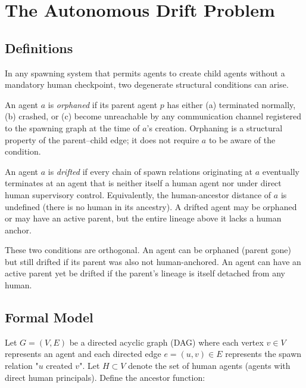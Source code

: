 \section{The Autonomous Drift Problem}

\subsection{Definitions}

In any spawning system that permits agents to create child agents without a mandatory human checkpoint, two degenerate structural conditions can arise.

\begin{definition}
An agent $a$ is \emph{orphaned} if its parent agent $p$ has either (a) terminated normally, (b) crashed, or (c) become unreachable by any communication channel registered to the spawning graph at the time of $a$'s creation. Orphaning is a structural property of the parent--child edge; it does not require $a$ to be aware of the condition.
\end{definition}

\begin{definition}
An agent $a$ is \emph{drifted} if every chain of spawn relations originating at $a$ eventually terminates at an agent that is neither itself a human agent nor under direct human supervisory control. Equivalently, the human-ancestor distance of $a$ is undefined (there is no human in its ancestry). A drifted agent may be orphaned or may have an active parent, but the entire lineage above it lacks a human anchor.
\end{definition}

These two conditions are orthogonal. An agent can be orphaned (parent gone) but still drifted if its parent was also not human-anchored. An agent can have an active parent yet be drifted if the parent's lineage is itself detached from any human.

\subsection{Formal Model}

Let $G = (V, E)$ be a directed acyclic graph (DAG) where each vertex $v \in V$ represents an agent and each directed edge $e = (u, v) \in E$ represents the spawn relation "$u$ created $v$". Let $H \subset V$ denote the set of human agents (agents with direct human principals). Define the ancestor function:

